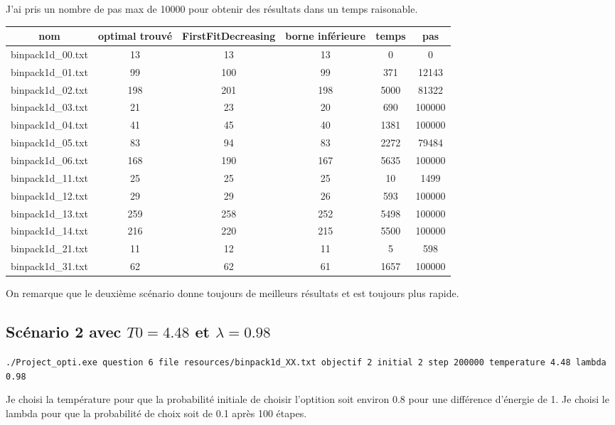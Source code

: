 \documentclass[10pt,a4paper]{article}
\begin{document}
J'ai pris un nombre de pas max de 10000 pour obtenir des résultats dans un temps raisonable.

\begin{center}
  \begin{tabular}{ | c | c | c | c | c | c | }  \hline
    nom               & optimal trouvé   & FirstFitDecreasing & borne inférieure & temps & pas \\ \hline
    binpack1d\_00.txt & 13 & 13 & 13 & 0 & 0 \\ \hline
    binpack1d\_01.txt & 99 & 100 & 99 & 371 & 12143 \\ \hline
    binpack1d\_02.txt & 198 & 201 & 198 & 5000 & 81322 \\ \hline
    binpack1d\_03.txt & 21 & 23 & 20 & 690 & 100000 \\ \hline
    binpack1d\_04.txt & 41 & 45 & 40 & 1381 & 100000 \\ \hline
    binpack1d\_05.txt & 83 & 94 & 83 & 2272 & 79484 \\ \hline
    binpack1d\_06.txt & 168 & 190 & 167 & 5635 & 100000 \\ \hline
    binpack1d\_11.txt & 25 & 25 & 25 & 10 & 1499 \\ \hline
    binpack1d\_12.txt & 29 & 29 & 26 & 593 & 100000 \\ \hline
    binpack1d\_13.txt & 259 & 258 & 252 & 5498 & 100000 \\ \hline
    binpack1d\_14.txt & 216 & 220 & 215 & 5500 & 100000 \\ \hline
    binpack1d\_21.txt & 11 & 12 & 11 & 5 & 598 \\ \hline
    binpack1d\_31.txt & 62 & 62 & 61 & 1657 & 100000 \\ \hline
  \end{tabular}
\end{center}

On remarque que le deuxième scénario donne toujours de meilleurs résultats et est toujours plus rapide.
\pagebreak
\subsection{Scénario 2 avec $T0 = 4.48$ et $\lambda = 0.98$}
\texttt{./Project\_opti.exe question 6 file resources/binpack1d\_XX.txt objectif 2 initial 2 step 200000 temperature 4.48 lambda 0.98}

Je choisi la température pour que la probabilité initiale de choisir l'optition soit environ 0.8 pour une différence d'énergie de 1.
Je choisi le lambda pour que la probabilité de choix soit de 0.1 après 100 étapes.
\end{document}
